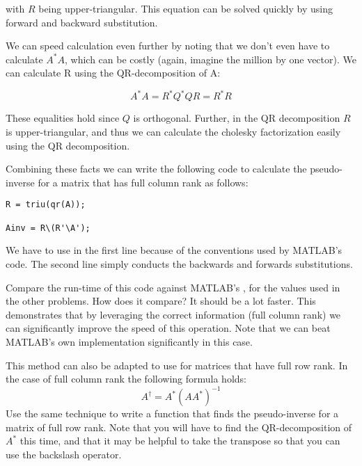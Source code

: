 with $R$ being upper-triangular. This equation can be solved quickly by using forward and backward substitution.

We can speed calculation even further by noting that we don't even have to calculate $A^* A$, which can be costly (again, imagine the million by one vector). We can calculate R using the QR-decomposition of A:

\[
A^* A = R^*Q^*QR = R^* R
\]

These equalities hold since $Q$ is orthogonal. Further, in the QR decomposition $R$ is upper-triangular, and thus we can calculate the cholesky factorization easily using the QR decomposition.

Combining these facts we can write the following code to calculate the pseudo-inverse for a matrix that has full column rank as follows:

\begin{lstlisting}
R = triu(qr(A));

Ainv = R\(R'\A');
\end{lstlisting}

We have to use  in the first line because of the conventions used by MATLAB's  code. The second line simply conducts the backwards and forwards substitutions.

\begin{problem}

Compare the run-time of this code against MATLAB's , for the values used in the other problems. How does it compare? It should be a lot faster. This demonstrates that by leveraging the correct information (full column rank) we can significantly improve the speed of this operation. Note that we can beat MATLAB's own implementation significantly in this case.

\end{problem}

\begin{problem}
This method can also be adapted to use for matrices that have full row rank. In the case of full column rank the following formula holds:
\[
A^\dagger = A^*(A A^*)^{-1}
\]
Use the same technique to write a function that finds the pseudo-inverse for a matrix of full row rank. Note that you will have to find the QR-decomposition of $A^*$ this time, and that it may be helpful to take the transpose so that you can use the backslash operator.
\end{problem}
